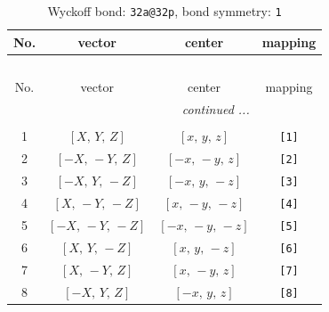\documentclass[fleqn,8pt]{jsarticle}
\begin{document}
\begin{longtable}{cccc}
\caption{Wyckoff bond: {\tt 32a@32p}, bond symmetry: {\tt 1}}
 \\
 \hline \hline
No. & vector & center & mapping \\ \hline \endfirsthead

\multicolumn{3}{l}{\tablename\ \thetable{}} \\
 \hline \hline
No. & vector & center & mapping \\ \hline \endhead

 \hline \hline
\multicolumn{3}{r}{\footnotesize\it continued ...} \\ \endfoot

 \hline \hline
\multicolumn{3}{r}{} \\ \endlastfoot

1 & $\left[ X,\, Y,\, Z \right]$ & $\left[ x,\, y,\, z \right]$ & {\tt [1]} \\ \hline
2 & $\left[ - X,\, - Y,\, Z \right]$ & $\left[ - x,\, - y,\, z \right]$ & {\tt [2]} \\ \hline
3 & $\left[ - X,\, Y,\, - Z \right]$ & $\left[ - x,\, y,\, - z \right]$ & {\tt [3]} \\ \hline
4 & $\left[ X,\, - Y,\, - Z \right]$ & $\left[ x,\, - y,\, - z \right]$ & {\tt [4]} \\ \hline
5 & $\left[ - X,\, - Y,\, - Z \right]$ & $\left[ - x,\, - y,\, - z \right]$ & {\tt [5]} \\ \hline
6 & $\left[ X,\, Y,\, - Z \right]$ & $\left[ x,\, y,\, - z \right]$ & {\tt [6]} \\ \hline
7 & $\left[ X,\, - Y,\, Z \right]$ & $\left[ x,\, - y,\, z \right]$ & {\tt [7]} \\ \hline
8 & $\left[ - X,\, Y,\, Z \right]$ & $\left[ - x,\, y,\, z \right]$ & {\tt [8]} \\
\end{longtable}
\end{document}

